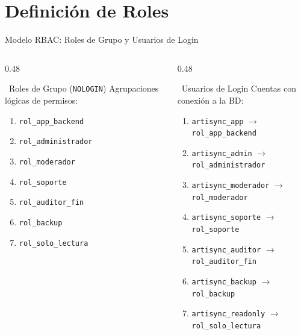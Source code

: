 \documentclass[aspectratio=169]{beamer}
\begin{document}
\section{Definición de Roles}

\begin{frame}{Modelo RBAC: Roles de Grupo y Usuarios de Login}
    \begin{columns}[T]
        \begin{column}{0.48\textwidth}
            \begin{block}{\faLayerGroup\ Roles de Grupo (\texttt{NOLOGIN})}
                \scriptsize
                Agrupaciones lógicas de permisos:
                \begin{enumerate}
                    \item \texttt{rol\_app\_backend}
                    \item \texttt{rol\_administrador}
                    \item \texttt{rol\_moderador}
                    \item \texttt{rol\_soporte}
                    \item \texttt{rol\_auditor\_fin}
                    \item \texttt{rol\_backup}
                    \item \texttt{rol\_solo\_lectura}
                \end{enumerate}
            \end{block}
        \end{column}
        \begin{column}{0.48\textwidth}
            \begin{block}{\faSignInAlt\ Usuarios de Login}
                \scriptsize
                Cuentas con conexión a la BD:
                \begin{enumerate}
                    \item \texttt{artisync\_app} $\rightarrow$ \texttt{rol\_app\_backend}
                    \item \texttt{artisync\_admin} $\rightarrow$ \texttt{rol\_administrador}
                    \item \texttt{artisync\_moderador} $\rightarrow$ \texttt{rol\_moderador}
                    \item \texttt{artisync\_soporte} $\rightarrow$ \texttt{rol\_soporte}
                    \item \texttt{artisync\_auditor} $\rightarrow$ \texttt{rol\_auditor\_fin}
                    \item \texttt{artisync\_backup} $\rightarrow$ \texttt{rol\_backup}
                    \item \texttt{artisync\_readonly} $\rightarrow$ \texttt{rol\_solo\_lectura}
                \end{enumerate}
            \end{block}
        \end{column}
    \end{columns}
\end{frame}
\end{document}
